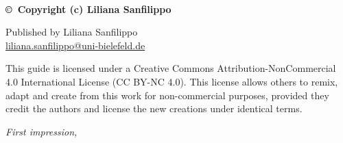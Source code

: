 \pagecolor{pgcolor}
~\vfill
\thispagestyle{empty}
\setlength{\parindent}{0pt}
\setlength{\parskip}{\baselineskip}


\textbf{\copyright\ Copyright (c) Liliana Sanfilippo \the\year\ }


\small{Published by Liliana Sanfilippo}\\
\small{\href{mailto:liliana.sanfilippo@uni-bielefeld.de}{liliana.sanfilippo@uni-bielefeld.de}}




\begin{flushright}
	This guide is licensed under a Creative Commons Attribution-NonCommercial 4.0 International License (CC BY-NC 4.0). This license allows others to remix, adapt and create from this work for non-commercial purposes, provided they credit the authors and license the new creations under identical terms.
\end{flushright}

\par\textit{First impression, \monthyear}

\setlength{\parindent}{\indentacaopar}

\restoregeometry
\nopagecolor